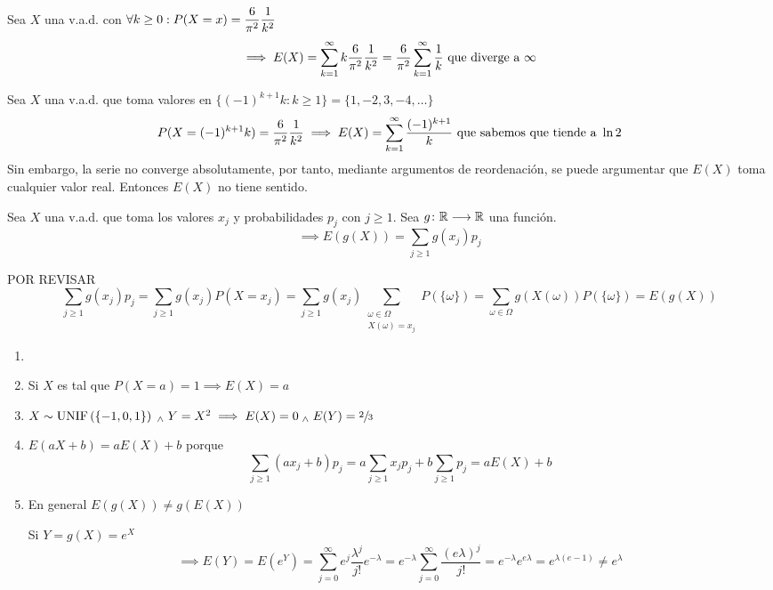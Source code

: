 \begin{ejem}
	Sea $X$ una v.a.d. con $\displaystyle \forall k \geq 0 : P(X=x)=\frac{6}{\pi^2}\frac{1}{k^2}$
	\[\implies E(X)=\sum_{k=1}^\infty k\frac{6}{\pi^2}\frac{1}{k^2}=\frac{6}{\pi^2}\sum_{k=1}^\infty \frac{1}{k} \text{  que diverge a } \infty\]
\end{ejem}
\begin{ejem}
	Sea $X$ una v.a.d. que toma valores en $\{(-1)^{k+1}k : k \geq 1\} = \{1, -2, 3, -4, \dots\}$
	\[P(X=(-1)^{k+1}k)=\frac{6}{\pi^2}\frac{1}{k^2} \implies E(X)=\sum_{k=1}^\infty \frac{(-1)^{k+1}}{k} \text{ que sabemos que tiende a } \ln{2}\]
	Sin embargo, la serie no converge absolutamente, por tanto, mediante argumentos de reordenación, se puede argumentar que $E(X)$ toma cualquier valor real. Entonces $E(X)$ no tiene sentido.
\end{ejem}

\begin{teo}
	Sea $X$ una v.a.d. que toma los valores $x_j$ y probabilidades $p_j$ con $j \geq 1$. Sea $g \colon \mathbb{R} \longrightarrow \mathbb{R}$ una función.
	\[\implies E(g(X))=\sum_{j\geq 1}g(x_j)p_j\]
	\begin{dem}
		POR REVISAR
		\[\sum_{j\geq 1}g(x_j)p_j=\sum_{j\geq 1}g(x_j)P(X=x_j)=\sum_{j\geq 1}g(x_j)\sum_{\substack{\omega\in\Omega \\ X(\omega)=x_j}}P(\{\omega\})=\sum_{\omega\in\Omega}g(X(\omega))P(\{\omega\})=E(g(X))\]
	\end{dem}
\end{teo}

\begin{obs}
	\begin{enumerate}
		\item[]
		\item Si $X$ es tal que $P(X=a)=1\implies E(X)=a$
		\item $X \sim \operatorname{UNIF}\left(\{-1, 0, 1\}\right) \; _{\wedge} \; Y=X^2 \implies E(X)=0 \; _{\wedge} \; E(Y)=\sfrac{2}{3}$
		\item $E(aX+b)=aE(X)+b$ porque
		\[\sum_{j\geq 1}(ax_j+b)p_j=a\sum_{j\geq 1}x_jp_j+b\sum_{j\geq 1}p_j=aE(X)+b\]
		\item En general $E(g(X)) \ne g(E(X))$
		\begin{ejem}[$X\sim\poisson{\lambda} \implies E(X)=\lambda$]
			Si $Y=g(X)=e^X$
			\[\implies E(Y)=E(e^Y)=\sum_{j=0}^\infty e^j\frac{\lambda^j}{j!}e^{-\lambda}=e^{-\lambda}\sum_{j=0}^\infty \frac{(e\lambda)^{j}}{j!}=e^{-\lambda}e^{e\lambda}=e^{\lambda(e-1)}\ne e^\lambda\]
		\end{ejem}
	\end{enumerate}
\end{obs}


